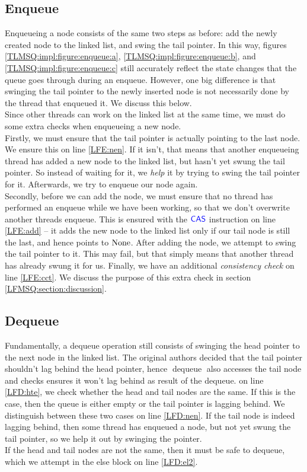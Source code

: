 \documentclass[a4paper, 10pt]{report}
\theoremstyle{definition}
\newcommand{\dequeue}{\operatorname{dequeue}}
\begin{document}
\subsection{Enqueue}
Enqueueing a node consists of the same two steps as before: add the newly created node to the linked list, and swing the tail pointer. In this way, figures \ref{TLMSQ:impl:figure:enqueue:a}, \ref{TLMSQ:impl:figure:enqueue:b}, and \ref{TLMSQ:impl:figure:enqueue:c} still accurately reflect the state changes that the queue goes through during an enqueue. However, one big difference is that swinging the tail pointer to the newly inserted node is not necessarily done by the thread that enqueued it. We discuss this below.\\
Since other threads can work on the linked list at the same time, we must do some extra checks when enqueueing a new node.\\
Firstly, we must ensure that the tail pointer is actually pointing to the last node. We ensure this on line \ref{LFE:nen}. If it isn't, that means that another enqueueing thread has added a new node to the linked list, but hasn't yet swung the tail pointer. So instead of waiting for it, we \textit{help} it by trying to swing the tail pointer for it. Afterwards, we try to enqueue our node again.\\
Secondly, before we can add the node, we must ensure that no thread has performed an enqueue while we have been working, so that we don't overwrite another threads enqueue. This is ensured with the $\textsf{\color{blue} CAS}$ instruction on line \ref{LFE:add} -- it adds the new node to the linked list only if our tail node is still the last, and hence points to $\operatorname{None}$. After adding the node, we attempt to swing the tail pointer to it. This may fail, but that simply means that another thread has already swung it for us.
Finally, we have an additional \textit{consistency check} on line \ref{LFE:cct}. We discuss the purpose of this extra check in section \ref{LFMSQ:section:discussion}.

\subsection{Dequeue}
Fundamentally, a dequeue operation still consists of swinging the head pointer to the next node in the linked list. The original authors decided that the tail pointer shouldn't lag behind the head pointer, hence $\dequeue$ also accesses the tail node and checks ensures it won't lag behind as result of the dequeue. on line \ref{LFD:hte}, we check whether the head and tail nodes are the same. If this is the case, then the queue is either empty or the tail pointer is lagging behind. We distinguish between these two cases on line \ref{LFD:nen}. If the tail node is indeed lagging behind, then some thread has enqueued a node, but not yet swung the tail pointer, so we help it out by swinging the pointer.\\
If the head and tail nodes are not the same, then it must be safe to dequeue, which we attempt in the else block on line \ref{LFD:el2}.
\end{document}
